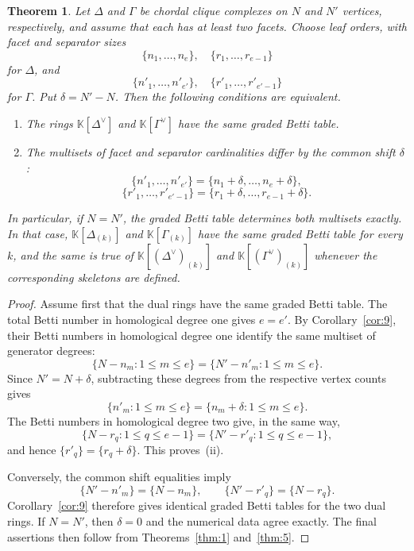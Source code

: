 \documentclass[11pt]{amsart}
\newtheorem{theorem}{Theorem}[section]
\theoremstyle{definition}
\theoremstyle{remark}
\newcommand{\K}{\mathbb K}
\newcommand{\SR}[1]{\K[#1]}
\begin{document}
	\begin{theorem}\label{thm:7}
		Let $\Delta$ and $\Gamma$ be chordal clique complexes on $N$ and $N'$ vertices, respectively, and assume that each has at least two facets. Choose leaf orders, with facet and separator sizes
		\[
		\{n_1,\ldots,n_e\},\quad \{r_1,\ldots,r_{e-1}\}
		\]
		for $\Delta$, and
		\[
		\{n'_1,\ldots,n'_{e'}\},\quad \{r'_1,\ldots,r'_{e'-1}\}
		\]
		for $\Gamma$. Put $\delta=N'-N$. Then the following conditions are equivalent.
		\begin{enumerate}
			\item[(i)] The rings $\SR{\Delta^\vee}$ and $\SR{\Gamma^\vee}$ have the same graded Betti table.
			\item[(ii)] The multisets of facet and separator cardinalities differ by the common shift $\delta$:
			\[
			\{n'_1,\ldots,n'_{e'}\}=\{n_1+\delta,\ldots,n_e+\delta\},
			\]
			\[
			\{r'_1,\ldots,r'_{e'-1}\}=\{r_1+\delta,\ldots,r_{e-1}+\delta\}.
			\]
		\end{enumerate}
		In particular, if $N=N'$, the graded Betti table determines both multisets exactly. In that case, $\SR{\Delta_{(k)}}$ and $\SR{\Gamma_{(k)}}$ have the same graded Betti table for every $k$, and the same is true of $\SR{(\Delta^\vee)_{(k)}}$ and $\SR{(\Gamma^\vee)_{(k)}}$ whenever the corresponding skeletons are defined.
	\end{theorem}
	
	\begin{proof}
		Assume first that the dual rings have the same graded Betti table. The total Betti number in homological degree one gives $e=e'$. By Corollary~\ref{cor:9}, their Betti numbers in homological degree one identify the same multiset of generator degrees:
		\[
		\{N-n_m:1\le m\le e\}
		=
		\{N'-n'_m:1\le m\le e\}.
		\]
		Since $N'=N+\delta$, subtracting these degrees from the respective vertex counts gives
		\[
		\{n'_m:1\le m\le e\}=\{n_m+\delta:1\le m\le e\}.
		\]
		The Betti numbers in homological degree two give, in the same way,
		\[
		\{N-r_q:1\le q\le e-1\}
		=
		\{N'-r'_q:1\le q\le e-1\},
		\]
		and hence $\{r'_q\}=\{r_q+\delta\}$. This proves~(ii).
		
		Conversely, the common shift equalities imply
		\[
		\{N'-n'_m\}=\{N-n_m\},
		\qquad
		\{N'-r'_q\}=\{N-r_q\}.
		\]
		Corollary~\ref{cor:9} therefore gives identical graded Betti tables for the two dual rings. If $N=N'$, then $\delta=0$ and the numerical data agree exactly. The final assertions then follow from Theorems~\ref{thm:1} and~\ref{thm:5}.
	\end{proof}
	
\end{document}
